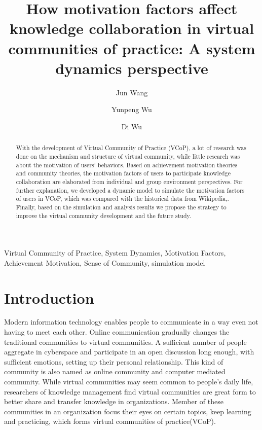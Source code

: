 \documentclass{elsarticle}
\begin{document}
\begin{frontmatter}
\title{How  motivation factors affect knowledge collaboration in
  virtual communities of practice:
A system dynamics perspective}
\author[buaa]{Jun Wang}

\author[buaa]{Yunpeng Wu}

\author[buaa]{Di Wu}

\address[buaa]{School of Economics and Management, Beihang University, 
Beijing 100083, P.R. China}

\begin{abstract}
 With the development of Virtual Community of Practice (VCoP), a lot of research was done on the mechanism and structure of virtual community, while little research was about the motivation of users’ behaviors. Based on achievement motivation theories and community theories, the motivation factors of users to participate knowledge collaboration are elaborated from individual and group environment perspectives. For further explanation, we developed a dynamic model to simulate the motivation factors of users in VCoP, which was compared with the historical data from Wikipedia,. Finally, based on the simulation and analysis results we propose the strategy to improve the virtual community development and the future study. 

\end{abstract}

\begin{keyword}
  Virtual Community of Practice, System Dynamics, Motivation Factors, Achievement Motivation, Sense of Community, simulation model

\end{keyword}
\end{frontmatter}

\section{Introduction}
\label{sec:introduction}
Modern information technology enables people to communicate in a way
even not having to meet each other. Online communication gradually changes the
traditional communities to virtual communities.  A sufficient number of
people  aggregate in cyberspace and participate in  an open discussion
long enough, with sufficient emotions, setting up  their personal
relationship\cite{rheingold2000vch}. This kind of community is also
named as online community and computer mediated community. While
virtual communities may seem common to people's daily life,
researchers of knowledge management find virtual communities are great
form to better share and transfer knowledge in organizations. Member
of these communities in an organization focus their eyes on certain
topics, keep learning and practicing,  which forms virtual
communities of practice(VCoP). 
\end{document}
